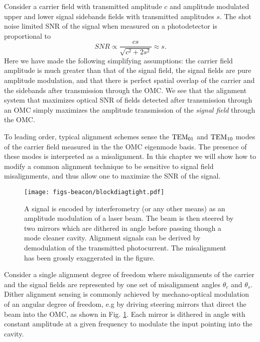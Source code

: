 Consider a carrier field with transmitted amplitude $c$ and amplitude modulated upper and lower signal sidebands fields with transmitted amplitudes $s$. %
The shot noise limited SNR of the signal when measured on a photodetector is proportional to
%
\begin{equation}
SNR \propto \frac{cs}{\sqrt{c^2 + 2s^2}} \approx s.
\end{equation}
%
Here we have made the following simplifying assumptions: the carrier field amplitude is much greater than that of the signal field, the signal fields are pure amplitude modulation, and that there is perfect spatial overlap of the carrier and the sidebands after transmission through the OMC. %
We see that the alignment system that maximizes optical SNR of fields detected after transmission through an OMC simply maximizes the amplitude transmission of the {\it signal field} through the OMC. %

To leading order, typical alignment schemes sense the ${\rm TEM}_{01}$ and ${\rm TEM}_{10}$  modes of the carrier field measured in the the OMC eigenmode basis\cite{Anderson1984}. %
The presence of these modes is interpreted as a misalignment. %
In this chapter we will show how to modify a common alignment technique to be sensitive to signal field misalignments, and thus allow one to maximize the SNR of the signal.

\begin{figure}%
  \begin{center}
  \leavevmode
  \texttt{[image: figs-beacon/blockdiagtight.pdf]}
  \end{center}
  \caption[Block diagram of dither alignment sensing.]{A signal is encoded by interferometry (or any other means) as an amplitude modulation of a laser beam. The beam is then steered by two mirrors which are dithered in angle before passing though a mode cleaner cavity. Alignment signals can be derived by demodulation of the transmitted photocurrent. The misalignment has been grossly exaggerated in the figure.}
  \label{fig:beaconblockdiag}
\end{figure}

Consider a single alignment degree of freedom where misalignments of the carrier and the signal fields are represented by one set of misalignment angles $\theta_c$ and $\theta_s$. %
Dither alignment sensing is commonly achieved by mechano-optical modulation of an angular degree of freedom, e.g by driving steering mirrors that direct the beam into the OMC, as shown in Fig. %
\ref{fig:beaconblockdiag}. %
Each mirror is dithered in angle with constant amplitude at a given frequency to modulate the input pointing into the cavity. %


